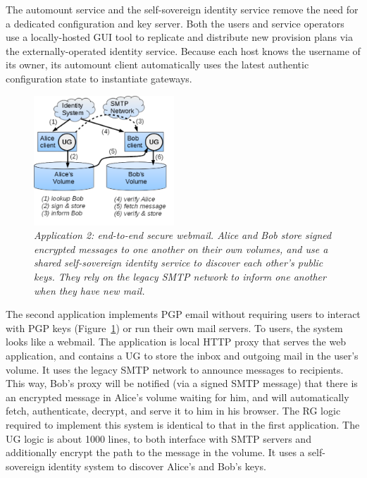 The automount service and the self-sovereign identity service remove the need
for a dedicated configuration and key server.  Both the users and service
operators use a locally-hosted GUI tool to replicate and distribute new
provision plans via the externally-operated identity service.  Because each host knows
the username of its owner, its automount client automatically uses the latest
authentic configuration state to instantiate gateways.

\begin{figure}[t!]
\centering
\includegraphics[width=0.47\textwidth]{figures/secure-mail}
\caption{\it Application 2: end-to-end secure webmail. Alice and Bob store
   signed encrypted messages to one another on their own volumes, and use a
   shared self-sovereign identity service to discover each other's public keys.
   They rely on the legacy SMTP network to inform one another when they have new
   mail.}
\label{fig:secure-mail}
\end{figure}

The second application implements PGP email without requiring users to interact
with PGP keys (Figure~\ref{fig:secure-mail}) or run their own mail servers.
To users, the system looks like a webmail. The application is
local HTTP proxy that serves the web application, and contains a UG to store the
inbox and outgoing mail in the user's volume. It uses the legacy SMTP
network to announce messages to recipients. This way, Bob's proxy will be
notified (via a signed SMTP message) that there is an encrypted message in
Alice's volume waiting for him, and will automatically fetch, authenticate,
decrypt, and serve it to him in his browser. The RG logic required to implement
this system is identical to that in the first application. The UG logic is about
1000 lines, to both interface with SMTP servers and additionally encrypt the
path to the message in the volume. It uses a self-sovereign identity system to discover Alice's and
Bob's keys.

